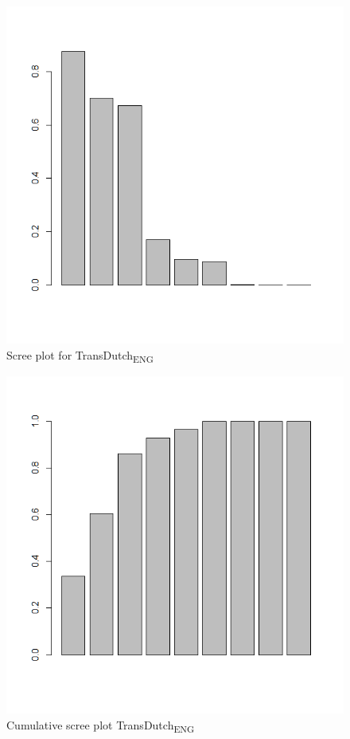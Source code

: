 \begin{figure}
\includegraphics[height=.3\textheight]{figures/Vandevoorde2-img22.png}
\caption{\label{fig:3:22}  Scree plot for TransDutch\textsubscript{ENG}}
\end{figure}

\begin{figure}
\includegraphics[height=.3\textheight]{figures/Vandevoorde2-img23.png}
\caption{\label{fig:3:23}  Cumulative scree plot TransDutch\textsubscript{ENG}}
\end{figure}

